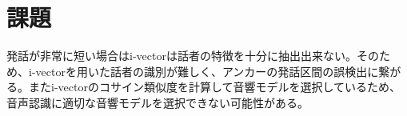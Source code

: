 \section{課題}
発話が非常に短い場合はi-vectorは話者の特徴を十分に抽出出来ない。そのため、i-vectorを用いた話者の識別が難しく、アンカーの発話区間の誤検出に繋がる。またi-vectorのコサイン類似度を計算して音響モデルを選択しているため、音声認識に適切な音響モデルを選択できない可能性がある。
